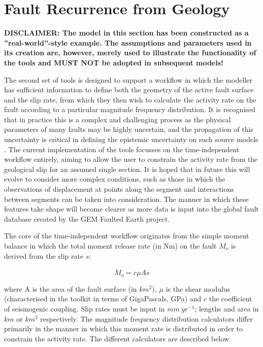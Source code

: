 \section{Fault Recurrence from Geology}

\textbf{DISCLAIMER: The model in this section has been constructed as a ''real-world''-style example. The assumptions and parameters used in its creation are, however, merely used to illustrate the functionality of the tools and MUST NOT be adopted in subsequent models!}

The second set of tools is designed to support a workflow in which the modeller has sufficient information to define both the geometry of the active fault surface and the slip rate, from which they then wish to calculate the activity rate on the fault according to a particular magnitude frequency distribution. It is recognised that in practice this is a complex and challenging process as the physical parameters of many faults may be highly uncertain, and the propagation of this uncertainty is critical in defining the epistemic uncertainty on such source models \citep{Peruzza_etal2010}. The current implementation of the tools focusses on the time-independent workflow entirely, aiming to allow the user to constrain the activity rate from the geological slip for an assumed single section. It is hoped that in future this will evolve to consider more complex conditions, such as those in which the observations of displacement at points along the segment and interactions between segments can be taken into consideration. The manner in which these features take shape will become clearer as more data is input into the global fault database created by the GEM Faulted Earth project.

The core of the time-independent workflow originates from the simple moment balance 
in which the total moment release rate (in Nm) on the fault $\dot{M}_o$ is derived from the slip rate $\dot{s}$\citep{AndersonLuco1983, Bungum2007}: 

\begin{equation}
\dot{M}_o = c \mu A \dot{s}
\end{equation}

where A is the area of the fault surface (in $km^2$), $\mu$ is the shear modulus (characterised in the toolkit in terms of GigaPascals, GPa) and $c$ the coefficient of seismogenic coupling. Slip rates must be input in $mm\ yr^{-1}$; lengths and area in $km$ or $km^2$ respectively. The magnitude frequency distribution calculators differ primarily in the manner in which this moment rate is distributed in order to constrain the activity rate. The different calculators are described below.


